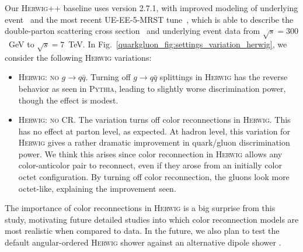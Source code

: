\documentclass[11pt]{cernrep}
\begin{document}
Our \textsc{Herwig++} baseline uses version 2.7.1, with improved modeling of underlying event~\cite{Gieseke:2012ft} and the most recent UE-EE-5-MRST tune~\cite{Seymour:2013qka}, which is able to describe the double-parton scattering cross section~\cite{Bahr:2013gkj} and underlying event data from $\sqrt{s} = 300$~GeV to $\sqrt{s} = 7$~TeV.  In Fig.~\ref{quarkgluon_fig:settings_variation_herwig}, we consider the following  \textsc{Herwig} variations:
\begin{itemize}
\item \textsc{Herwig: no $g \to q\bar{q}$}.  Turning off $g \to q \bar{q}$ splittings in \textsc{Herwig} has the reverse behavior as seen in \textsc{Pythia}, leading to slightly worse discrimination power, though the effect is modest.
\item \textsc{Herwig: no CR}.  The variation turns off color reconnections in \textsc{Herwig}.  This has no effect at parton level, as expected.  At hadron level, this variation for \textsc{Herwig} gives a rather dramatic improvement in quark/gluon discrimination power.  We think this arises since color reconnection in \textsc{Herwig} allows any color-anticolor pair to reconnect, even if they arose from an initially color octet configuration.  By turning off color reconnection, the gluons look more octet-like, explaining the improvement seen.
\end{itemize}
The importance of color reconnections in \textsc{Herwig} is a big surprise from this study, motivating future detailed studies into which color reconnection models are most realistic when compared to data.  In the future, we also plan to test the default angular-ordered \textsc{Herwig} shower against an alternative dipole shower \cite{Platzer:2011bc}.
\end{document}
